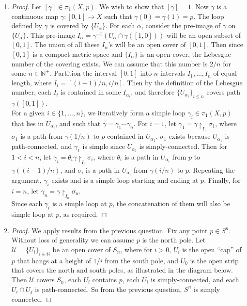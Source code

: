 \documentclass{article}
\begin{document}
\begin{enumerate}
    \item
    \begin{proof}
      Let $[\gamma]\in\pi_1(X,p)$. We wish to show that $[\gamma]=1$. Now
      $\gamma$ is a continuous map $\gamma:[0,1]\rightarrow X$ such that
      $\gamma(0)=\gamma(1)=p$. The loop defined by $\gamma$ is covered by
      $\{U_\alpha\}$. For each $\alpha$, consider the pre-image of $\gamma$
      on $\{U_\alpha\}$. This pre-image $I_\alpha=\gamma^{-1}(U_\alpha\cap
      \gamma([1,0]))$ will be an open subset of $[0,1]$. The union of all
      these $I_\alpha$'s will be an open cover of $[0,1]$. Then since
      $[0,1]$ is a compact metric space and $\{I_\alpha\}$ is an open
      cover, the Lebesgue number of the covering exists. We can assume that
      this number is $2/n$ for some $n\in\mathbb{N}^+$. Partition the
      interval $[0,1]$ into $n$ intervals $I_1,\ldots,I_n$ of equal length,
      where $I_i=[(i-1)/n,i/n]$. Then by the definition of the Lebesgue
      number, each $I_i$ is contained in some $I_{\alpha_i}$, and therefore
      $\{U_{\alpha_i}\}_{i\leq n}$ covers path $\gamma([0,1])$. \\

      For a given $i\in\{1,\ldots,n\}$, we iteratively form a simple loop
      $\gamma_i\in\pi_1(X,p)$ that lies in $U_{\alpha_i}$, and such that
      $\gamma=\gamma_1\cdots\gamma_n$. For $i=1$, let
      $\gamma_1=\gamma\upharpoonright_{I_1}\sigma_1$, where $\sigma_1$ is a
      path from $\gamma(1/n)$ to $p$ contained in $U_{\alpha_1}$.
      $\sigma_1$ exists because $U_{\alpha_1}$ is path-connected, and
      $\gamma_1$ is simple since $U_{\alpha_1}$ is simply-connected. Then
      for $1<i<n$, let
      $\gamma_i=\theta_i\gamma\upharpoonright_{I_i}\sigma_i$, where
      $\theta_i$ is a path in $U_{\alpha_i}$ from $p$ to
      $\gamma((i-1)/n)$, and $\sigma_i$ is a path in $U_{\alpha_i}$ from
      $\gamma(i/n)$ to $p$. Repeating the argument, $\gamma_i$ exists
      and is a simple loop starting and ending at $p$. Finally, for
      $i=n$, let $\gamma_n=\gamma\upharpoonright_{I_n}\sigma_n$. \\

      Since each $\gamma_i$ is a simple loop at $p$, the concatenation of
      them will also be simple loop at $p$, as required.
    \end{proof}

    \item
    \begin{proof}
      We apply results from the previous question. Fix any point $p\in
      S^n$. Without loss of generality we can assume $p$ is the north pole.
      Let $\mathcal{U}=\{U_i\}_{i\in\mathbb{N}}$ be an open cover of $S_n$,
      where for $i>0$, $U_i$ is the open ``cap'' of $p$ that hangs at a
      height of $1/i$ from the south pole, and $U_0$ is the open strip that
      covers the north and south poles, as illustrated in the diagram
      below. Then $\mathcal{U}$ covers $S_n$, each $U_i$ contains $p$, each
      $U_i$ is simply-connected, and each $U_i\cap U_j$ is path-connected.
      So from the previous question, $S^n$ is simply connected.
    \end{proof}
\end{enumerate}
\end{document}

